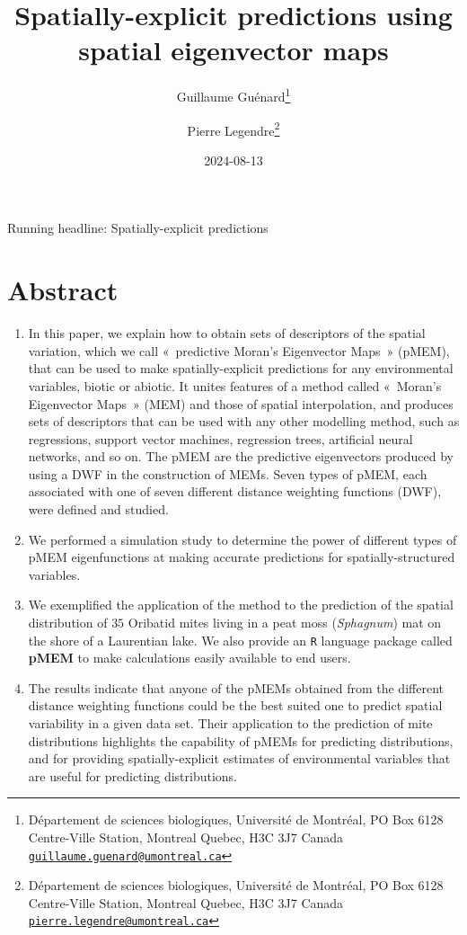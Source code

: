 \documentclass[
]{article}
\title{Spatially-explicit predictions using spatial eigenvector maps}
\author{Guillaume Guénard\footnote{Département de sciences biologiques,
  Université de Montréal, PO Box 6128 Centre-Ville Station, Montreal
  Quebec, H3C 3J7 Canada
  \href{mailto:guillaume.guenard@umontreal.ca}{\nolinkurl{guillaume.guenard@umontreal.ca}}} \and Pierre
Legendre\footnote{Département de sciences biologiques, Université de
  Montréal, PO Box 6128 Centre-Ville Station, Montreal Quebec, H3C 3J7
  Canada
  \href{mailto:pierre.legendre@umontreal.ca}{\nolinkurl{pierre.legendre@umontreal.ca}}}}
\date{2024-08-13}
\begin{document}
\maketitle

Running headline: Spatially-explicit predictions

\section{Abstract}\label{abstract}

\begin{enumerate}
\def\labelenumi{\arabic{enumi}.}
\item
  In this paper, we explain how to obtain sets of descriptors of the
  spatial variation, which we call «~predictive Moran's Eigenvector
  Maps~» (pMEM), that can be used to make spatially-explicit predictions
  for any environmental variables, biotic or abiotic. It unites features
  of a method called «~Moran's Eigenvector Maps~» (MEM) and those of
  spatial interpolation, and produces sets of descriptors that can be
  used with any other modelling method, such as regressions, support
  vector machines, regression trees, artificial neural networks, and so
  on. The pMEM are the predictive eigenvectors produced by using a DWF
  in the construction of MEMs. Seven types of pMEM, each associated with
  one of seven different distance weighting functions (DWF), were
  defined and studied.
\item
  We performed a simulation study to determine the power of different
  types of pMEM eigenfunctions at making accurate predictions for
  spatially-structured variables.
\item
  We exemplified the application of the method to the prediction of the
  spatial distribution of \(35\) Oribatid mites living in a peat moss
  (\emph{Sphagnum}) mat on the shore of a Laurentian lake. We also
  provide an \texttt{R} language package called \textbf{pMEM} to make
  calculations easily available to end users.
\item
  The results indicate that anyone of the pMEMs obtained from the
  different distance weighting functions could be the best suited one to
  predict spatial variability in a given data set. Their application to
  the prediction of mite distributions highlights the capability of
  pMEMs for predicting distributions, and for providing
  spatially-explicit estimates of environmental variables that are
  useful for predicting distributions.
\end{enumerate}
\end{document}
